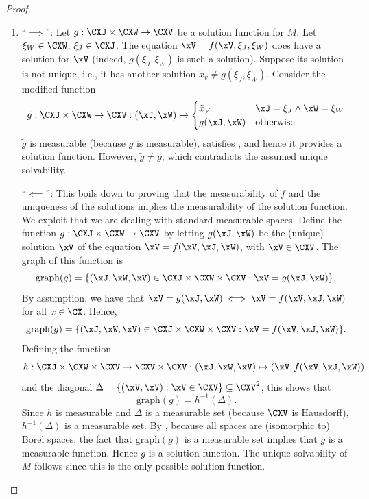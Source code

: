 \begin{proof}
  \begin{enumerate}
    \item 
    ``$\implies$'': Let $g : \CXJ \times \CXW \to \CXV$ be a solution function for $M$. 
    Let $\xi_W\in\CXW$, $\xi_J\in\CXJ$. The equation $\xV = f(\xV,\xi_J,\xi_W)$ does have a solution for
    $\xV$ (indeed, $g(\xi_J,\xi_W)$ is such a solution). Suppose its solution is not unique, i.e., it has another
    solution $\tilde{x}_v \ne g(\xi_J,\xi_W)$. Consider the modified function
      $$\tilde{g} : \CXJ \times \CXW \to \CXV : (\xJ,\xW) \mapsto \begin{cases}
        \tilde{x}_V & \xJ = \xi_J \land \xW = \xi_W \\
        g(\xJ,\xW)  & \text{otherwise}
      \end{cases}$$
    $\tilde{g}$ is measurable (because $g$ is measurable), satisfies , and hence it provides a solution function. 
    However, $\tilde{g} \ne g$, which contradicts the assumed unique solvability.

    ``$\impliedby$'':
    This boils down to proving that the measurability of $f$ and the uniqueness of the solutions implies the measurability of the solution function.
    We exploit that we are dealing with standard measurable spaces.
    Define the function $g : \CXJ \times \CXW \to \CXV$ by letting $g(\xJ,\xW)$ be the (unique) solution $\xV$ of the
    equation $\xV = f(\xV,\xJ,\xW)$, with $\xV\in\CXV$. The graph of this function is
    $$\mathrm{graph}(g) = \{(\xJ,\xW,\xV) \in \CXJ \times \CXW \times \CXV : \xV = g(\xJ,\xW)\}.$$
    By assumption, we have that $\xV = g(\xJ,\xW) \iff \xV = f(\xV,\xJ,\xW)$ for all $x \in \CX$. Hence,
    $$\mathrm{graph}(g) = \{(\xJ,\xW,\xV) \in \CXJ \times \CXW \times \CXV : \xV = f(\xV,\xJ,\xW)\}.$$
    Defining the function 
    $$h : \CXJ \times \CXW \times \CXV \to \CXV \times \CXV : (\xJ,\xW,\xV) \mapsto (\xV, f(\xV,\xJ,\xW))$$
    and the diagonal $\Delta = \{(\xV,\xV) : \xV \in \CXV\} \subseteq \CXV^2$, this shows that
    $$\mathrm{graph}(g) = h^{-1}(\Delta).$$
    Since $h$ is measurable and $\Delta$ is a measurable set (because $\CXV$ is Hausdorff), $h^{-1}(\Delta)$ is a measurable set.
    By \cite[14.12]{Kec95}, because all spaces are (isomorphic to) Borel spaces, the fact that $\mathrm{graph}(g)$ is a measurable set implies that $g$ is a measurable function. Hence $g$ is a solution function. The unique solvability of $M$ follows since this is the only possible solution function.


\end{enumerate}
\end{proof}
